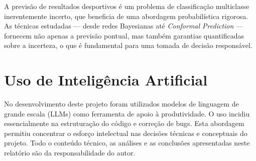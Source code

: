 \documentclass[12pt, a4paper]{article}
\begin{document}
A previsão de resultados desportivos é um problema de classificação multiclasse inerentemente incerto, que beneficia de uma abordagem probabilística rigorosa. As técnicas estudadas — desde redes Bayesianas até \textit{Conformal Prediction} — fornecem não apenas a previsão pontual, mas também garantias quantificadas sobre a incerteza, o que é fundamental para uma tomada de decisão responsável.

\section*{Uso de Inteligência Artificial}

No desenvolvimento deste projeto foram utilizados modelos de linguagem de grande escala (LLMs) como ferramenta de apoio à produtividade. O uso incidiu essencialmente na estruturação do código e correção de bugs. Esta abordagem permitiu concentrar o esforço intelectual nas decisões técnicas e conceptuais do projeto. Todo o conteúdo técnico, as análises e as conclusões apresentadas neste relatório são da responsabilidade do autor.
\end{document}
